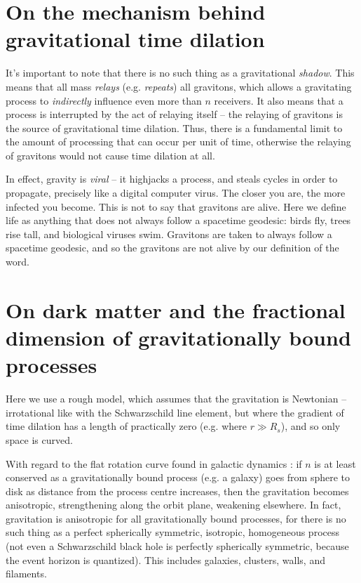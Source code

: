 \documentclass[12pt]{article}
\begin{document}
\section{On the mechanism behind gravitational time dilation}
It's important to note that there is no such thing as a gravitational {\textit{shadow}}.
This means that all mass {\textit{relays}} (e.g. {\textit{repeats}}) all gravitons, which allows a gravitating process to {\textit{indirectly}} influence even more than $n$ receivers.
It also means that a process is interrupted by the act of relaying itself -- the relaying of gravitons is the source of gravitational time dilation.
Thus, there is a fundamental limit to the amount of processing that can occur per unit of time, otherwise the relaying of gravitons would not cause time dilation at all.

In effect, gravity is {\textit{viral}} -- it highjacks a process, and steals cycles in order to propagate, precisely like a digital computer virus.
The closer you are, the more infected you become.
This is not to say that gravitons are alive.
Here we define life as anything that does not always follow a spacetime geodesic: birds fly, trees rise tall, and biological viruses swim.
Gravitons are taken to always follow a spacetime geodesic, and so the gravitons are not alive by our definition of the word.






\section{On dark matter and the fractional dimension of gravitationally bound processes}

Here we use a rough model, which assumes that the gravitation is Newtonian -- irrotational like with the Schwarzschild line element, but where the gradient of time dilation has a length of practically zero (e.g. where $r \gg R_s$), and so only space is curved.

With regard to the flat rotation curve found in galactic dynamics \cite{binney}: if $n$ is at least conserved as a gravitationally bound process (e.g. a galaxy) goes from sphere to disk as distance from the process centre increases, then the gravitation becomes anisotropic, strengthening along the orbit plane, weakening elsewhere.
In fact, gravitation is anisotropic for all gravitationally bound processes, for there is no such thing as a perfect spherically symmetric, isotropic, homogeneous process (not even a Schwarzschild black hole is perfectly spherically symmetric, because the event horizon is quantized).
This includes galaxies, clusters, walls, and filaments.
\end{document}
